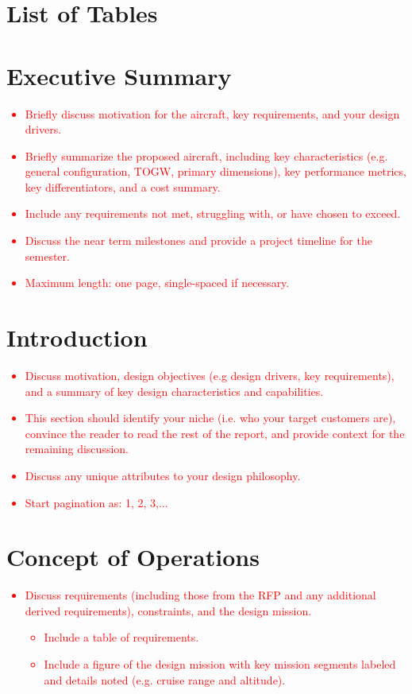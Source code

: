 \documentclass[conf]{new-aiaa}
\begin{document}
\newpage
\section{List of Tables}


\newpage
\section{Executive Summary}
\textcolor{red}{
\begin{itemize}
    \item Briefly discuss motivation for the aircraft, key requirements, and your design drivers.
    \item Briefly  summarize the proposed aircraft, including key  characteristics (e.g. general configuration, TOGW, primary dimensions), key performance metrics, key differentiators, and a cost summary.
    \item Include any requirements not met, struggling with, or have chosen to exceed.
    \item Discuss the near term milestones and provide a project timeline for the semester.
    \item Maximum length: one page, single-spaced if necessary.
\end{itemize}}

\section{Introduction}
\textcolor{red}{
\begin{itemize}
    \item Discuss motivation, design objectives (e.g design drivers, key requirements), and a summary of key design characteristics and capabilities.
    \item This section should identify your niche (i.e. who your target customers are), convince the reader to read the rest of the report, and provide context for the remaining discussion.
    \item Discuss any unique attributes to your design philosophy.
    \item Start pagination as: 1, 2, 3,...
\end{itemize}}

\section{Concept of Operations}
\textcolor{red}{
\begin{itemize}
    \item Discuss requirements (including those from the RFP and any additional derived requirements), constraints, and the design mission.
    \begin{itemize}
        \item Include a table of requirements.
        \item Include a figure of the design mission with key mission segments labeled and details noted (e.g. cruise range and altitude).
    \end{itemize}
\end{itemize}}
\end{document}
